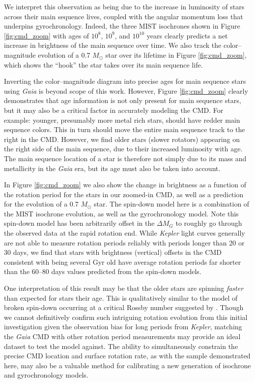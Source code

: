 \documentclass[preprint2]{aastex62}
\newcommand{\Kepler}{\textsl{Kepler}\xspace}
\begin{document}
We interpret this observation as being due to the increase in luminosity of stars across their main sequence lives, coupled with the angular momentum loss that underpins gyrochronology. Indeed, the three MIST isochrones shown in Figure \ref{fig:cmd_zoom} with ages of $10^8$, $10^9$, and $10^{10}$ years clearly predicts a net increase in brightness of the main sequence over time. We also track the color--magnitude evolution of a 0.7 $M_\odot$ star over its lifetime in Figure \ref{fig:cmd_zoom}, which shows the ``hook'' the star takes over its main sequence life. 

Inverting the color--magnitude diagram into precise ages for main sequence stars using {\em Gaia} is beyond scope of this work. However, Figure \ref{fig:cmd_zoom} clearly demonstrates that age information is not only present for main sequence stars, but it may also be a critical factor in accurately modeling the CMD. For example: younger, presumably more metal rich stars, should have redder main sequence colors. This in turn should move the entire main sequence track to the right in the CMD. However, we find older stars (slower rotators) appearing on the right side of the main sequence, due to their increased luminosity with age. The main sequence location of a star is therefore not simply due to its mass and metallicity in the {\em Gaia} era, but its age must also be taken into account.

In Figure \ref{fig:cmd_zoom} we also show the change in brightness as a function of the rotation period for the stars in our zoomed-in CMD, as well as a prediction for the evolution of a 0.7 $M_\odot$ star. The spin-down model here is a combination of the MIST isochrone evolution, as well as the \citet{meibom2009} gyrochronology model. Note this spin-down model has been arbitrarily offset in the $\Delta M_G$ to roughly go through the observed data at the rapid rotation end.
While \Kepler light curves generally are not able to measure rotation periods reliably with periods longer than 20 or 30 days, we find that stars with brightness (vertical) offsets in the CMD consistent with being several Gyr old have average rotation periods far shorter than the 60--80 days values predicted from the spin-down models.

One interpretation of this result may be that the older stars are spinning {\it faster} than expected for stars their age. This is qualitatively similar to the model of broken spin-down occurring at a critical Rossby number suggested by \citet{van-saders2016}. Though we cannot definitively confirm such intriguing rotation evolution from this initial investigation given the observation bias for long periods from \Kepler, matching the {\em Gaia} CMD with other rotation period measurements may provide an ideal dataset to test the \citet{van-saders2016} model against. The ability to simultaneously constrain the precise CMD location and surface rotation rate, as with the sample demonstrated here, may also be a valuable method for calibrating a new generation of isochrone and gyrochronology models.
\end{document}
